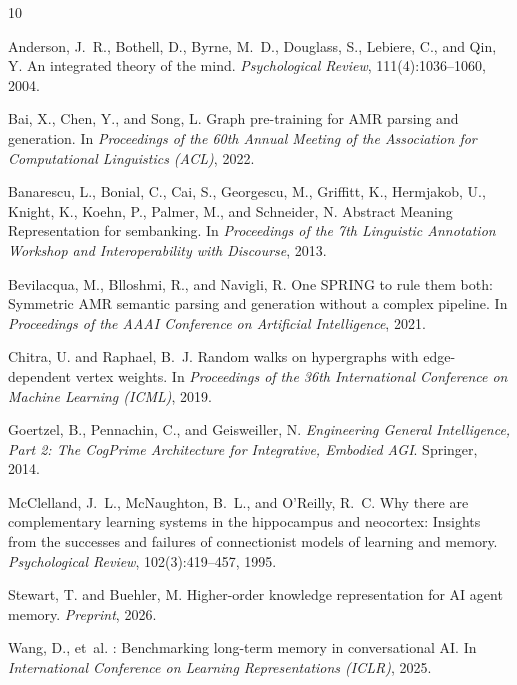 \documentclass[11pt,a4paper]{article}
\begin{document}



\begin{thebibliography}{10}

Anderson, J.~R., Bothell, D., Byrne, M.~D., Douglass, S., Lebiere, C., and Qin, Y.
\newblock An integrated theory of the mind.
\newblock \emph{Psychological Review}, 111(4):1036--1060, 2004.

Bai, X., Chen, Y., and Song, L.
\newblock Graph pre-training for {AMR} parsing and generation.
\newblock In \emph{Proceedings of the 60th Annual Meeting of the Association for Computational Linguistics (ACL)}, 2022.

Banarescu, L., Bonial, C., Cai, S., Georgescu, M., Griffitt, K., Hermjakob, U., Knight, K., Koehn, P., Palmer, M., and Schneider, N.
\newblock Abstract {M}eaning {R}epresentation for sembanking.
\newblock In \emph{Proceedings of the 7th Linguistic Annotation Workshop and Interoperability with Discourse}, 2013.

Bevilacqua, M., Blloshmi, R., and Navigli, R.
\newblock One {SPRING} to rule them both: Symmetric {AMR} semantic parsing and generation without a complex pipeline.
\newblock In \emph{Proceedings of the AAAI Conference on Artificial Intelligence}, 2021.

Chitra, U. and Raphael, B.~J.
\newblock Random walks on hypergraphs with edge-dependent vertex weights.
\newblock In \emph{Proceedings of the 36th International Conference on Machine Learning (ICML)}, 2019.

Goertzel, B., Pennachin, C., and Geisweiller, N.
\newblock \emph{Engineering General Intelligence, Part 2: The CogPrime Architecture for Integrative, Embodied AGI}.
\newblock Springer, 2014.

McClelland, J.~L., McNaughton, B.~L., and O'Reilly, R.~C.
\newblock Why there are complementary learning systems in the hippocampus and neocortex: Insights from the successes and failures of connectionist models of learning and memory.
\newblock \emph{Psychological Review}, 102(3):419--457, 1995.

Stewart, T. and Buehler, M.
\newblock Higher-order knowledge representation for {AI} agent memory.
\newblock \emph{Preprint}, 2026.

Wang, D., et~al.
: Benchmarking long-term memory in conversational {AI}.
\newblock In \emph{International Conference on Learning Representations (ICLR)}, 2025.

\end{thebibliography}
\end{document}
